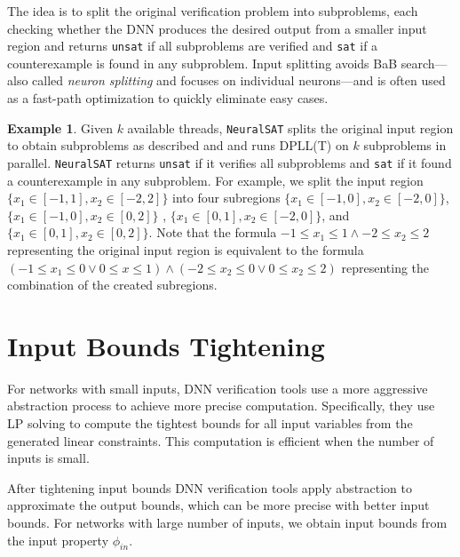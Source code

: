 \documentclass[oneside,11pt,dvipsnames]{book}
\numberwithin{equation}{section}
\theoremstyle{definition}
\newtheorem{example}{Example}[section]
\theoremstyle{remark}
\newcommand{\tvn}[1]{\iftoggle{usecomment}{{\color{red}{[TVN]: #1}}}{}}
\newcommand{\tool}{\texttt{NeuralSAT}}
\newcommand{\sat}{\texttt{sat}}
\newcommand{\unsat}{\texttt{unsat}}
\begin{document}
The idea is to split the original verification problem into subproblems, each checking whether the DNN produces the desired output from a smaller input region and returns \unsat{} if all subproblems are verified and \sat{} if a counterexample is found in any subproblem. Input splitting avoids BaB search---also called \emph{neuron splitting} and focuses on individual neurons---and is often used as a fast-path optimization to quickly eliminate easy cases.


\begin{example}
    

    Given $k$ available threads, \tool{} splits the original input region to obtain subproblems as described and and runs DPLL(T) on $k$ subproblems in parallel. %
\tool{} returns \texttt{unsat} if it verifies all subproblems and \texttt{sat} if it found a counterexample in any subproblem. %
For example, we split the input region $\{x_1 \in [-1,1] , x_2 \in [-2,2]\}$ into four subregions 
$\{x_1 \in [-1,0] , x_2 \in [-2,0]\}$, 
$\{x_1 \in [-1,0] , x_2 \in [0,2]\}$ , 
$\{x_1 \in [0,1] , x_2 \in [-2,0]\}$, and 
$\{x_1 \in [0,1], x_2 \in [0,2]\}$.  
Note that the formula $-1 \le x_1 \le 1 \land -2 \le x_2 \le 2$ representing the original input region is equivalent to the formula $(-1 \le x_1 \le 0 \lor 0 \le x \le 1) \land (-2 \le x_2 \le 0 \lor 0 \le x_2 \le 2)$ representing the combination of the created subregions.
\end{example}


\section{Input Bounds Tightening}\label{sec:inputboundstigthten}
For networks with small inputs, DNN verification tools use a more aggressive abstraction process to achieve more precise computation. Specifically, they use LP solving to compute the tightest bounds for all input variables from the generated linear constraints. This computation is efficient when the number of inputs is small.

After tightening input bounds DNN verification tools apply abstraction to approximate the output bounds, which can be more precise with better input bounds.
For networks with large number of inputs, we obtain input bounds from the input property $\phi_{in}$.\tvn{Vu: to rewrite}
\end{document}
